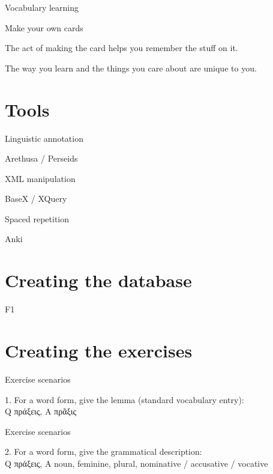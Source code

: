 \documentclass{beamer}
\begin{document}
\begin{frame}{Vocabulary learning}

\alert{Make your own cards}

The act of making the card helps you remember the stuff on it.

The way you learn and the things you care about are unique to you.

\end{frame}

\section{Tools}

\begin{frame}{Linguistic annotation}

Arethusa / Perseids

\end{frame}

\begin{frame}{XML manipulation}

BaseX / XQuery

\end{frame}

\begin{frame}{Spaced repetition}

Anki

\end{frame}

\section{Creating the database}

\begin{frame}{F1}


\end{frame}

\section{Creating the exercises}

\begin{frame}{Exercise scenarios}

1. For a word form, give the lemma (standard vocabulary entry):\\
Q πράξεις, A πρᾶξις

\end{frame}

\begin{frame}{Exercise scenarios}


2. For a word form, give the grammatical description:\\
Q πράξεις, A noun, feminine, plural, nominative / accusative / vocative

\end{frame}
\end{document}
